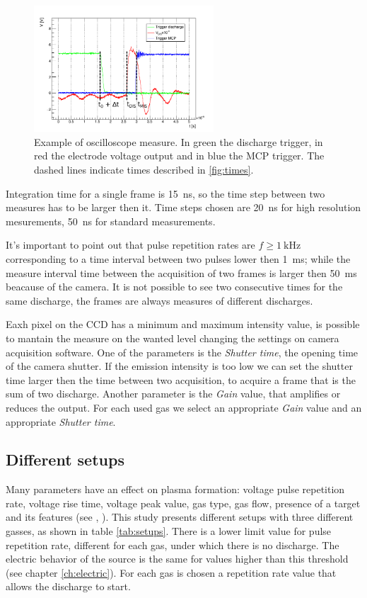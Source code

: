\begin{figure}
 \centering
 \includegraphics[width=0.6\textwidth]{Images/Shape/times_osc_2.png}
 \caption{Example of oscilloscope measure. In green the discharge trigger, in red the electrode voltage output and in blue the MCP trigger. The dashed lines indicate times described in \ref{fig:times}.}
 \label{fig:times_signals}
\end{figure}


Integration time for a single frame is \SI{15}{\nano\second}, so the time step between two measures has to be larger then it. Time steps chosen are \SI{20}{\nano\second} for high resolution mesurements, \SI{50}{\nano\second} for standard measurements.

It's important to point out that pulse repetition rates are $f \ge \SI{1}{\kilo\hertz}$ corresponding to a time interval between two pulses lower then \SI{1}{\milli\second}; while the measure interval time between the acquisition of two frames is larger then \SI{50}{\milli\second} beacause of the camera. It is not possible to see two consecutive times for the same discharge, the frames are always measures of different discharges.

Eaxh pixel on the CCD has a minimum and maximum intensity value, is possible to mantain the measure on the wanted level changing the settings on camera acquisition software.
One of the parameters is the \emph{Shutter time}, the opening time of the camera shutter. If the emission intensity is too low we can set the shutter time larger then the time between two acquisition, to acquire a frame that is the sum of two discharge.
Another parameter is the \emph{Gain} value, that amplifies or reduces the output.
For each used gas we select an appropriate \emph{Gain} value and an appropriate \emph{Shutter time}.

\subsection{Different setups}
Many parameters have an effect on plasma formation: voltage pulse repetition rate, voltage rise time, voltage peak value, gas type, gas flow, presence of a target and its features (see \cite{Mericam_Bourdet_2009}, \cite{Jarrige_2010}).
This study presents different setups with three different gasses, as shown in table \ref{tab:setups}.
There is a lower limit value for pulse repetition rate, different for each gas, under which there is no discharge. The electric behavior of the source is the same for values higher than this threshold (see chapter \ref{ch:electric}). For each gas is chosen a repetition rate value that allows the discharge to start.

